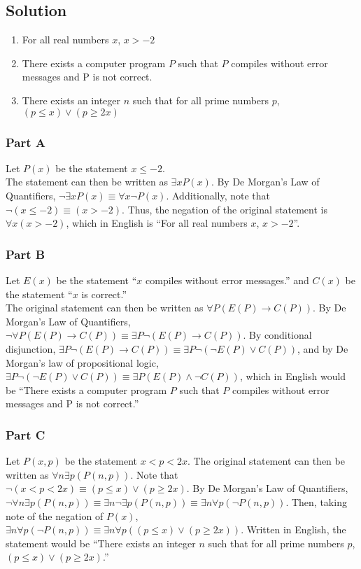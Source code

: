 \documentclass[table]{article}
\begin{document}
\subsection{Solution}
\begin{enumerate}[nosep, label=\alph*)]
\item For all real numbers $x$, $x > -2$
\item There exists a computer program $P$ such that $P$ compiles without error messages and P is not correct.
\item There exists an integer $n$ such that for all prime numbers $p$, $(p \leq x) \lor (p \geq 2x)$
\end{enumerate}
\subsubsection{Part A}
Let $P(x)$ be the statement $x \leq -2$.\\
The statement can then be written as $\exists xP(x)$. By De Morgan's Law of Quantifiers, $\neg \exists xP(x) \equiv \forall x \neg P(x)$. Additionally, note that $\neg(x \leq -2) \equiv (x > -2)$. Thus, the negation of the original statement is $\forall x(x > -2)$, which in English is ``For all real numbers $x$, $x > -2$''.
\subsubsection{Part B}
Let $E(x)$ be the statement ``$x$ compiles without error messages.'' and $C(x)$ be the statement ``$x$ is correct.''\\
The original statement can then be written as $\forall P(E(P) \rightarrow C(P))$. By De Morgan's Law of Quantifiers, $\neg \forall P(E(P) \rightarrow C(P)) \equiv \exists P \neg (E(P) \rightarrow C(P))$. By conditional disjunction, $\exists P \neg (E(P) \rightarrow C(P)) \equiv \exists P \neg (\neg E(P) \lor C(P))$, and by De Morgan's law of propositional logic, $\exists P \neg (\neg E(P) \lor C(P)) \equiv\exists P (E(P) \land \neg C(P))$, which in English would be ``There exists a computer program $P$ such that $P$ compiles without error messages and P is not correct.''
\subsubsection{Part C}
Let $P(x, p)$ be the statement $x < p < 2x$. The original statement can then be written as $\forall n \exists p(P(n, p))$. Note that $\neg(x < p < 2x) \equiv (p \leq x) \lor (p \geq 2x)$. By De Morgan's Law of Quantifiers,$\neg \forall n \exists p(P(n, p)) \equiv \exists n \neg \exists p(P(n, p)) \equiv \exists n \forall p(\neg P(n, p))$. Then, taking note of the negation of $P(x)$, $\exists n \forall p(\neg P(n, p)) \equiv \exists n \forall p((p \leq x) \lor (p \geq 2x))$. Written in English, the statement would be ``There exists an integer $n$ such that for all prime numbers $p$, $(p \leq x) \lor (p \geq 2x)$.''
\end{document}
